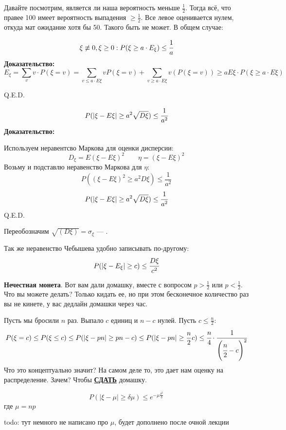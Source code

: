Давайте посмотрим, является ли наша вероятность меньше $\frac 1 2$. Тогда всё, что правее 100 имеет вероятность выпадения $\geq \frac1 2 $. Все левое оценивается нулем, откуда мат ожидание хотя бы 50. Такого быть не может. В общем случае:

$$\xi\not \equiv0,\xi\geq 0: P(\xi\geq a \cdot E_{\xi}) \leq \cfrac{1}{a}$$
\textbf{Доказательство:}
$$E_{\xi} = \sum\limits_{v}v \cdot P(\xi = v) = \sum\limits_{v \le a \cdot E\xi} v P(\xi = v)+ \sum\limits_{v\geq a\cdot E\xi} v (P(\xi=v))\geq a E{\xi}\cdot P (\xi\geq a\cdot E{\xi})$$

\hfill Q.E.D.

$$P(|\xi-E\xi|\geq a^2\sqrt{D\xi})\leq \cfrac{1}{a^2}$$
\textbf{Доказательство:}

Используем неравентсво Маркова для оценки дисперсии:
$$D_{\xi} = E(\xi-E\xi)^2\quad \quad  \eta = (\xi-E\xi)^2$$
Возьму и подставлю неравенство Маркова для $\eta$:
$$P((\xi-E\xi)^2\geq a^2D\xi)\leq \dfrac{1}{a^2} $$
$$ P(|\xi-E\xi|\geq a^2\sqrt{D\xi})\leq \cfrac{1}{a^2}$$
\hfill Q.E.D.


Переобозначим $\sqrt{(D\xi)} = \sigma_{\xi}$ --- .

Так же неравенство Чебышева удобно записывать по-другому:
$$P(|\xi-E_{\xi}|\geq c)\leq \cfrac{D\xi}{c^2}$$


\textbf{Нечестная монета}. Вот вам дали домашку, вместе  с вопросом $p>\frac{1}{2}$ или $p<\frac{1}{2}$. Что вы можете делать? Только кидать ее, но при этом бесконечное количество раз вы не кинете, у вас дедлайн домашки через час. 

Пусть мы бросили $n$ раз. Выпало $c$ единиц и $n-c$ нулей. Пусть $c\le \frac{n}{2}$:
$$P(\xi = c)\leq P(\xi\leq c)\leq P(|\xi-pn|\geq pn-c)\leq  P(|\xi-pn|\geq \frac n 2 c)\leq \cfrac{n}{4}\cdot \cfrac{1}{\left(\cfrac{n}{2}-c\right)^2}$$
Что это концептуально значит? На самом деле то, это дает нам оценку на распределение. Зачем? Чтобы \textbf{\uline{СДАТЬ}} домашку.

$$P(|\xi-\mu |\geq \delta\mu)\leq e^{-\mu\frac{\delta^2}{3}}$$
где $\mu = np$  

todo: тут немного не написано про $\mu$, будет дополнено после очной лекции

